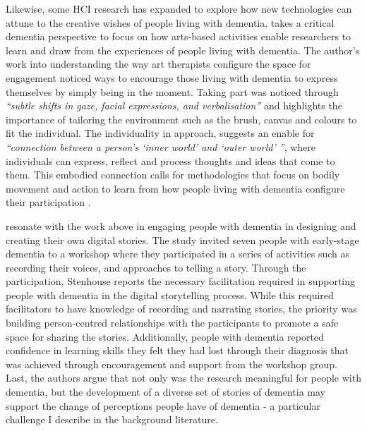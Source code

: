 Likewise, some HCI research has expanded to explore how new technologies can attune to the creative wishes of people living with dementia. \cite{lazar_critical_2017} takes a critical dementia perspective to focus on how arts-based activities enable researchers to learn and draw from the experiences of people living with dementia. The author's work into understanding the way art therapists configure the space for engagement noticed ways to encourage those living with dementia to express themselves by simply being in the moment. Taking part was noticed through \textit{``subtle shifts in gaze, facial expressions, and verbalisation''} and highlights the importance of tailoring the environment such as the brush, canvas and colours to fit the individual. The individuality in approach, suggests an enable for \textit{``connection between a person's `inner world' and `outer world' ''}, where individuals can express, reflect and process thoughts and ideas that come to them. This embodied connection calls for methodologies that focus on bodily movement and action to learn from how people living with dementia configure their participation \citep{morrissey_creative_2015}.

\cite{stenhouse2013dangling} resonate with the work above in engaging people with dementia in designing and creating their own digital stories. The study invited seven people with early-stage dementia to a workshop where they participated in a series of activities such as recording their voices, and approaches to telling a story. Through the participation, Stenhouse reports the necessary facilitation required in supporting people with dementia in the digital storytelling process. While this required facilitators to have knowledge of recording and narrating stories, the priority was building person-centred relationships with the participants to promote a safe space for sharing the stories. Additionally, people with dementia reported confidence in learning skills they felt they had lost through their diagnosis that was achieved through encouragement and support from the workshop group. Last, the authors argue that not only was the research meaningful for people with dementia, but the development of a diverse set of stories of dementia may support the change of perceptions people have of dementia - a particular challenge I describe in the background literature. 

